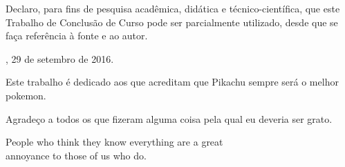 \documentclass[times,english,brazil,oneside]{ifes7}
\begin{document}
\begin{declaracaodoautor}

  \vspace*{1.5cm}

  Declaro, para fins de pesquisa acadêmica, didática e
  técnico-científica, que este Trabalho de Conclusão de Curso pode ser
  parcialmente utilizado, desde que se faça referência à fonte e ao
  autor.

  \vspace*{2.5cm}

  \centering

  \imprimirlocal, 29 de setembro de 2016.

  \vspace*{2.5cm}

  \imprimirautor

  \vspace*{\fill}
  
\end{declaracaodoautor}


\begin{dedicatoria}
  \vspace*{\fill}
  \hspace{0.2\textwidth}
  \begin{minipage}{0.8\textwidth}
    Este trabalho é dedicado aos que acreditam que Pikachu sempre será o
    melhor pokemon.
  \end{minipage}
\end{dedicatoria}


\begin{agradecimentos}
  Agradeço a todos os que fizeram alguma coisa pela qual eu deveria
  ser grato.
\end{agradecimentos}


\begin{epigrafe}
  \vspace*{\fill}
  \begin{otherlanguage}{english}
    \begin{flushright}
      \begin{SingleSpace}
        People who think they know everything are a great \\
        annoyance to those of us who do. \cite{Asimov2004}
      \end{SingleSpace}
    \end{flushright}
  \end{otherlanguage}
\end{epigrafe}
\end{document}
